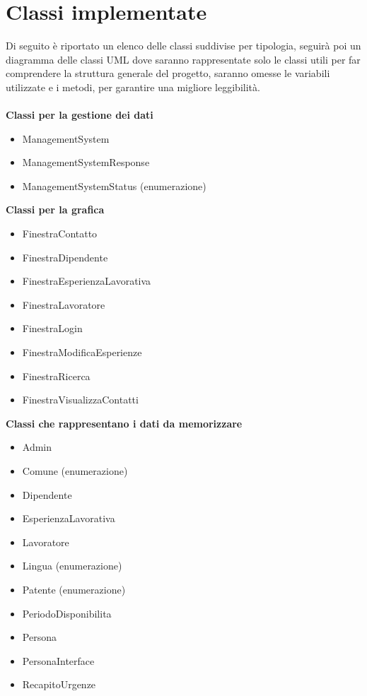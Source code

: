 \documentclass[ 4paper,11pt,openany]{book}
\begin{document}
\section{Classi implementate}
Di seguito è riportato un elenco delle classi suddivise per tipologia, seguirà poi un diagramma delle classi UML dove saranno rappresentate solo le classi utili per far comprendere la struttura generale del progetto, saranno omesse le variabili utilizzate e i metodi, per garantire una migliore leggibilità.\\\\
\textbf{Classi per la gestione dei dati}
\begin{itemize}
\item ManagementSystem
\item ManagementSystemResponse
\item ManagementSystemStatus (enumerazione)
\end{itemize}
\textbf{Classi per la grafica}
\begin{itemize}
\item FinestraContatto
\item FinestraDipendente
\item FinestraEsperienzaLavorativa
\item FinestraLavoratore
\item FinestraLogin 
\item FinestraModificaEsperienze
\item FinestraRicerca
\item FinestraVisualizzaContatti
\end{itemize}
\textbf{Classi che rappresentano i dati da memorizzare}
\begin{itemize}
\item Admin
\item Comune (enumerazione)
\item Dipendente
\item EsperienzaLavorativa
\item Lavoratore
\item Lingua (enumerazione)
\item Patente (enumerazione)
\item PeriodoDisponibilita
\item Persona
\item PersonaInterface
\item RecapitoUrgenze
\end{itemize}
\end{document}

